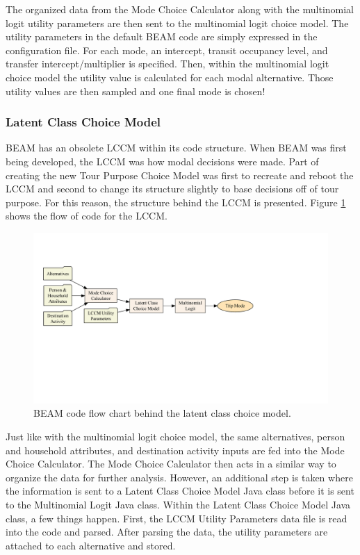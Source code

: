\documentclass[12pt, oneside, openright]{byuthesis}
\begin{document}
The organized data from the Mode Choice Calculator along with the multinomial logit utility parameters are then sent to the multinomial logit choice model. The utility parameters in the default BEAM code are simply expressed in the configuration file. For each mode, an intercept, transit occupancy level, and transfer intercept/multiplier is specified. Then, within the multinomial logit choice model the utility value is calculated for each modal alternative. Those utility values are then sampled and one final mode is chosen!

\hypertarget{latent-class-choice-model}{%
\subsubsection{Latent Class Choice Model}\label{latent-class-choice-model}}

BEAM has an obsolete LCCM within its code structure. When BEAM was first being developed, the LCCM was how modal decisions were made. Part of creating the new Tour Purpose Choice Model was first to recreate and reboot the LCCM and second to change its structure slightly to base decisions off of tour purpose. For this reason, the structure behind the LCCM is presented. Figure \ref{fig:lccmflow} shows the flow of code for the LCCM.

\begin{figure}

{\centering \includegraphics[width=650px]{thesis_files/figure-latex/lccmflow-1} 

}

\caption{BEAM code flow chart behind the latent class choice model.}\label{fig:lccmflow}
\end{figure}

Just like with the multinomial logit choice model, the same alternatives, person and household attributes, and destination activity inputs are fed into the Mode Choice Calculator. The Mode Choice Calculator then acts in a similar way to organize the data for further analysis. However, an additional step is taken where the information is sent to a Latent Class Choice Model Java class before it is sent to the Multinomial Logit Java class. Within the Latent Class Choice Model Java class, a few things happen. First, the LCCM Utility Parameters data file is read into the code and parsed. After parsing the data, the utility parameters are attached to each alternative and stored.
\end{document}
